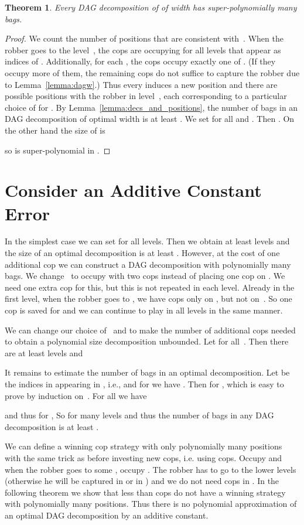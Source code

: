 \documentclass[authoryear]{article}
\makeatletter
\newtheorem{theorem}{Theorem}
\theoremstyle{definition}
\newcommand{\0}{\emptyset}
\newcommand{\ie}{i.e.\@\xspace}
\makeatother
\begin{document}
\begin{theorem}\label{thm:super-poly}
Every DAG decomposition of  of width  has
super-po\-ly\-no\-mial\-ly many bags.
\end{theorem}
\begin{proof}
We count the number of positions that are consistent
with~. When the robber goes to the level~, the cops are
occupying  for all levels  that appear as indices of
. Additionally, for each , the cops occupy exactly
one of . (If they occupy more
of them, the remaining cops do not suffice to capture the robber due
to Lemma~\ref{lemma:dagw}.)  Thus every  induces a new position and 
there are  possible positions with the robber in 
level~, each corresponding to a particular choice of  for
. By Lemma~\ref{lemma:decs_and_positions}, the number of bags in
  an DAG decomposition of optimal width is at least . We set  for all
 and . Then
. On the other hand the size of  is 

 so  is super-polynomial in
. 
\end{proof}


\section{Consider an Additive Constant Error}

In the simplest case we can set  for all
levels. Then we obtain at least  levels and the
size of an optimal decomposition is at least
.  However, at the cost of one additional
cop we can construct a DAG decomposition with polynomially many
bags. We change~ to occupy  with two cops instead of
placing one cop on . We need one extra cop for this, but this
is not repeated in each level. Already in the first level, when the
robber goes to , we have cops only
on , but not
on~. So one cop is saved for  and we can
continue to play in all levels in the same manner.

We can change our choice of~ and  to make the number of
additional cops needed to obtain a polynomial size decomposition
unbounded. Let  for
all~. Then there are at least  levels and

It remains to estimate the number of bags in an optimal
decomposition. Let  be the indices in 
appearing in , \ie , and for  we have . Then for ,  which is easy to prove by induction
on~. For all  we have 
 
and thus for ,
  So for  many levels  and thus the number
of bags in any DAG decomposition is at least .


We can define a winning cop strategy with only
polynomially many positions with the same trick as before investing
 new cops, \ie using  cops. Occupy  and when the
robber goes to some , occupy . The robber has to go to
the lower levels (otherwise he will be captured in
 or in ) and we do not need cops in
. In the following theorem we show that less than  cops
do not have a winning strategy with polynomially many positions. Thus
there is no polynomial approximation of an optimal DAG decomposition
by an additive constant.
\end{document}
